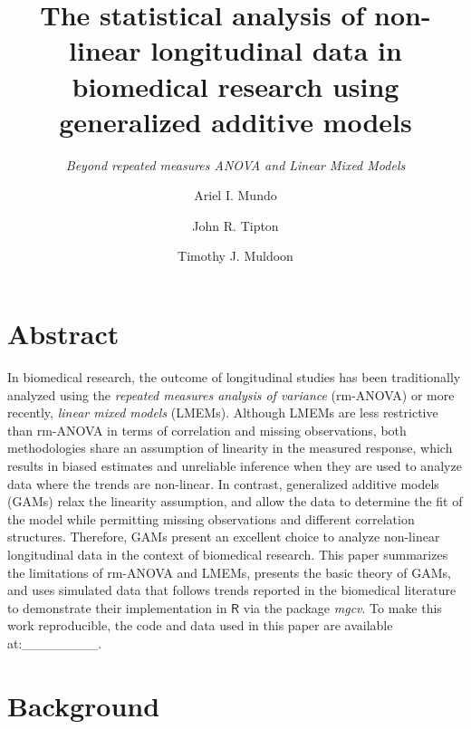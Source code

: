 \documentclass[
]{article}
\author[1]{Ariel I. Mundo}
\author[2]{John R. Tipton}
\author[1]{Timothy J. Muldoon}
\affil[1]{\footnotesize Department of Biomedical Engineering, University of Arkansas, Fayetteville, AR, USA}
\affil[2]{\footnotesize Department of Mathematical Sciences, University of Arkansas, Fayetteville, AR, USA}
\title{\textbf{The statistical analysis of non-linear longitudinal data in biomedical research using generalized additive models}}
\subtitle{\emph{Beyond repeated measures ANOVA and Linear Mixed Models}}
\date{\vspace{-2.5em}}
\begin{document}
\maketitle

{
\setcounter{tocdepth}{2}
\tableofcontents
}
\hypertarget{abstract}{%
\section{Abstract}\label{abstract}}

In biomedical research, the outcome of longitudinal studies has been traditionally analyzed using the \emph{repeated measures analysis of variance} (rm-ANOVA) or more recently, \emph{linear mixed models} (LMEMs). Although LMEMs are less restrictive than rm-ANOVA in terms of correlation and missing observations, both methodologies share an assumption of linearity in the measured response, which results in biased estimates and unreliable inference when they are used to analyze data where the trends are non-linear. In contrast, generalized additive models (GAMs) relax the linearity assumption, and allow the data to determine the fit of the model while permitting missing observations and different correlation structures. Therefore, GAMs present an excellent choice to analyze non-linear longitudinal data in the context of biomedical research. This paper summarizes the limitations of rm-ANOVA and LMEMs, presents the basic theory of GAMs, and uses simulated data that follows trends reported in the biomedical literature to demonstrate their implementation in \(\textsf{R}\) via the package \emph{mgcv}. To make this work reproducible, the code and data used in this paper are available at:\_\_\_\_\_\_\_\_.

\hypertarget{background}{%
\section{Background}\label{background}}
\end{document}
